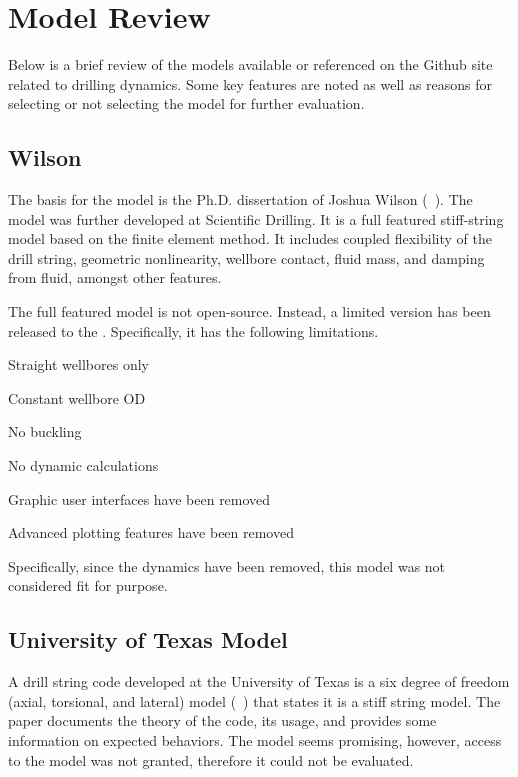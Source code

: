 \chapter{Model Review}
\label{ch:modelreview}

Below is a brief review of the models available or referenced on the \osdc{} Github site related to drilling dynamics.  Some key features are noted as well as reasons for selecting or not selecting the model for further evaluation.

\section{Wilson}
The basis for the model is the Ph.D. dissertation of Joshua Wilson (~\cite{ref:wilson2017a}).  The model was further developed at Scientific Drilling.  It is a full featured stiff-string model based on the finite element method.  It includes coupled flexibility of the drill string, geometric nonlinearity, wellbore contact, fluid mass, and damping from fluid, amongst other features.

The full featured model is not open-source.  Instead, a limited version has been released to the \osdc{}.  Specifically, it has the following limitations.
\begin{bulletedlist}
	\item Straight wellbores only
	\item Constant wellbore OD
	\item No buckling
	\item No dynamic calculations
	\item Graphic user interfaces have been removed
	\item Advanced plotting features have been removed
\end{bulletedlist}
Specifically, since the dynamics have been removed, this model was not considered fit for purpose.

\section{University of Texas Model}
A drill string code developed at the University of Texas is a six degree of freedom  (axial, torsional, and lateral) model (~\cite{ref:zhang2023a}) that states it is a stiff string model.  The paper documents the theory of the code, its usage, and provides some information on expected behaviors.  The model seems promising, however, access to the model was not granted, therefore it could not be evaluated.

